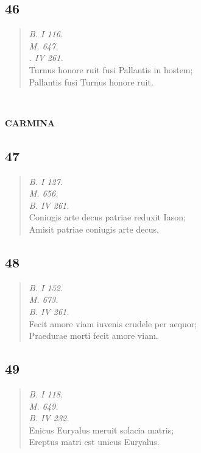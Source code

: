 \documentclass[11pt, a4paper]{report}
\begin{document}
            \subsection*{46}
      \begin{verse}
      \textit{B. I 116.} \\ \textit{M. 647.} \\ \textit{. IV 261.} \\ Turnus honore ruit fusi Pallantis in hostem; \\ Pallantis fusi Turnus honore ruit. \\ 
      \end{verse}
  
            
        ﻿\pagebreak 
    
             \marginpar{[104]} 
            \begin{center} \textbf{CARMINA} \end{center}
            \subsection*{47}
      \begin{verse}
      \textit{B. I 127.} \\ \textit{M. 656.} \\ \textit{B. IV 261.} \\ Coniugis arte decus patriae reduxit Iason; \\ Amisit patriae coniugis arte decus. \\ 
      \end{verse}
  
            \subsection*{48}
      \begin{verse}
      \textit{B. I 152.} \\ \textit{M. 673.} \\ \textit{B. IV 261.} \\ Fecit amore viam iuvenis crudele per aequor; \\ Praedurae morti fecit amore viam. \\ 
      \end{verse}
  
            \subsection*{49}
      \begin{verse}
      \textit{B. I 118.} \\ \textit{M. 649.} \\ \textit{B. IV 232.} \\ Enicus Euryalus meruit solacia matris; \\ Ereptus matri est unicus Euryalus. \\ 
      \end{verse}
  
\end{document}
